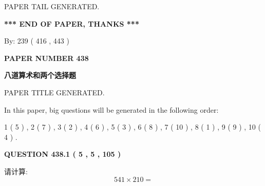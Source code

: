 \documentclass{ctexart}
\begin{document}
   
   
   
   
   
 \vspace{0.2in}
 
   
   
\vspace{2.0in} PAPER TAIL GENERATED.
   
   
   
   
\vspace{1.0in} 
{\textbf{\large{ *** END OF PAPER, THANKS *** }}} 
   
   
\hspace{1.0in} By: 
 239 ( 416 ,  443 )
   
   
   
   
\newpage 
\setcounter{page}{ 
   438001 } 
   
   
   
   
 {\textbf{ \Large{ PAPER NUMBER  438  }}}
   
   
\vspace{0.2in}
   
   
   
   
   
   
   
   
 \vspace{0.2in}
{\LARGE {\textbf{ 八道算术和两个选择题}}}
   
   
 PAPER TITLE GENERATED.
   
   
   
\vspace{0.2in}
   
In this paper, big questions will be generated in the following order: 
   
   
   1 ( 5 )
 ,
   2 ( 7 )
 ,
   3 ( 2 )
 ,
   4 ( 6 )
 ,
   5 ( 3 )
 ,
   6 ( 8 )
 ,
   7 ( 10 )
 ,
   8 ( 1 )
 ,
   9 ( 9 )
 ,
   10 ( 4 )
 .
  
\vspace{0.2in}
  
{\textbf{\Large{QUESTION
438.1 
 ( 5 , 5 , 105 )
}}}
  
  
 
请计算:
\begin{equation}
541  \times    %
210 = \nonumber
\end{equation}
 
 
 
\noindent{}
 
\end{document}
